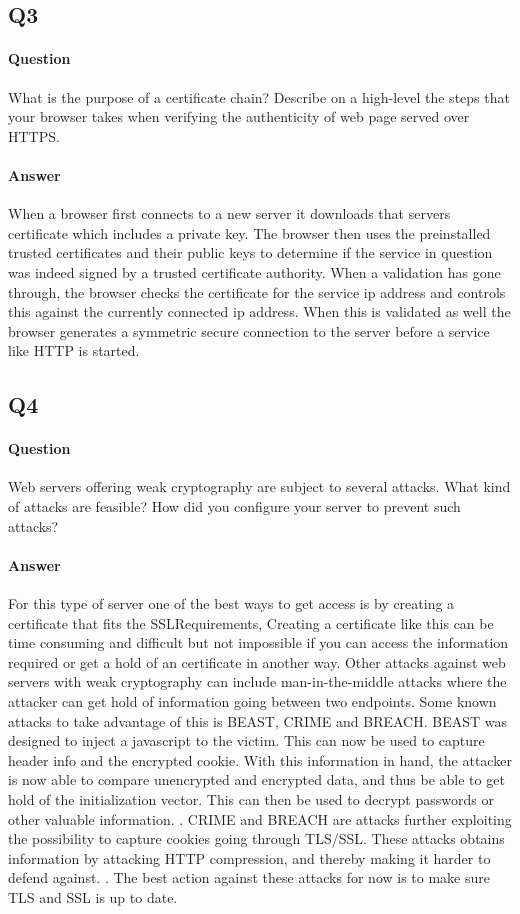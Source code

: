 \documentclass[11pt, a4paper]{article}
\begin{document}
\subsection{Q3}
\paragraph{Question}
What is the purpose of a certificate chain? Describe on a high-level the steps that your
browser takes when verifying the authenticity of web page served over HTTPS.
\paragraph{Answer}
When a browser first connects to a new server it downloads that servers certificate which includes a private key. The browser then uses the preinstalled trusted certificates and their public keys to determine if the service in question was indeed signed by a trusted certificate authority. When a validation has gone through, the browser checks the certificate for the service ip address and controls this against the currently connected ip address. When this is validated as well the browser generates a symmetric secure connection to the server before a service like HTTP is started. 
\subsection{Q4}
\paragraph{Question}
Web servers offering weak cryptography are subject to several attacks. What kind of
attacks are feasible? How did you configure your server to prevent such attacks?
\paragraph{Answer}
For this type of server one of the best ways to get access is by creating a certificate that fits the SSLRequirements, Creating a certificate like this can be time consuming and difficult but not impossible if you can access the information required or get a hold of an certificate in another way.
Other attacks against web servers with weak cryptography can include man-in-the-middle attacks where the attacker can get hold of information going between two endpoints. Some known attacks to take advantage of this is BEAST, CRIME and BREACH. BEAST was designed to inject a javascript to the victim. This can now be used to capture header info and the encrypted cookie. With this information in hand, the attacker is now able to compare unencrypted and encrypted data, and thus be able to get hold of the initialization vector. This can then be used to decrypt passwords or other valuable information. \cite{context}. CRIME and BREACH are attacks further exploiting the possibility to capture cookies going through TLS/SSL. These attacks obtains information by attacking HTTP compression, and thereby making it harder to defend against. \cite{iSEC}. The best action against these attacks for now is to make sure TLS and SSL is up to date.
\end{document}
